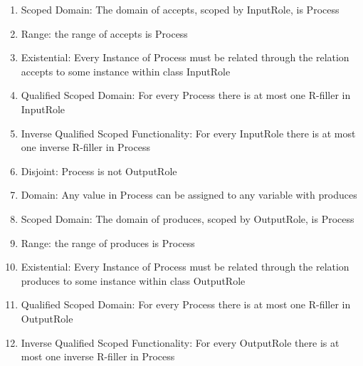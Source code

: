 \begin{enumerate}
    \item Scoped Domain: The domain of \textsf{accepts}, scoped by \textsf{InputRole}, is \textsf{Process} %
    \item Range: the range of \textsf{accepts} is \textsf{Process} %
    \item Existential: Every Instance of \textsf{Process} must be related through the relation \textsf{accepts} to some instance within class \textsf{InputRole} %
    \item Qualified Scoped Domain: For every \textsf{Process} there is at most one R-filler in \textsf{InputRole} %
    \item Inverse Qualified Scoped Functionality: For every \textsf{InputRole} there is at most one inverse R-filler in \textsf{Process} %
    \item Disjoint: \textsf{Process} is not \textsf{OutputRole}  %
    \item Domain: Any value in \textsf{Process} can be assigned to any variable with \textsf{produces} %
    \item Scoped Domain: The domain of \textsf{produces}, scoped by \textsf{OutputRole}, is \textsf{Process} %
    \item Range: the range of \textsf{produces} is \textsf{Process} %
    \item Existential: Every Instance of \textsf{Process} must be related through the relation \textsf{produces} to some instance within class \textsf{OutputRole} %
    \item Qualified Scoped Domain: For every \textsf{Process} there is at most one R-filler in \textsf{OutputRole} %
    \item Inverse Qualified Scoped Functionality: For every \textsf{OutputRole} there is at most one inverse R-filler in \textsf{Process} %
\end{enumerate}
